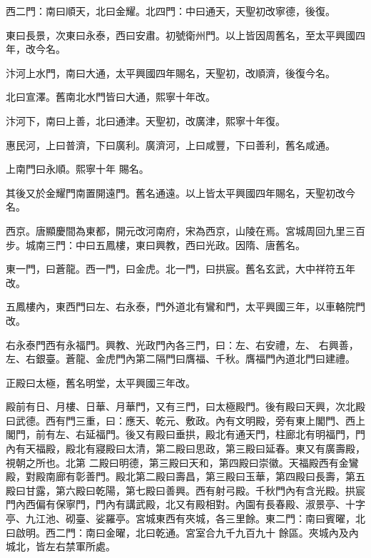 \begin{pinyinscope}
 西二門：南曰順天，北曰金耀。北四門：中曰通天，天聖初改寧德，後復。



 東曰長景，次東曰永泰，西曰安肅。初號衛州門。以上皆因周舊名，至太平興國四年，改今名。



 汴河上水門，南曰大通，太平興國四年賜名，天聖初，改順濟，後復今名。



 北曰宣澤。舊南北水門皆曰大通，熙寧十年改。



 汴河下，南曰上善，北曰通津。天聖初，改廣津，熙寧十年復。



 惠民河，上曰普濟，下曰廣利。廣濟河，上曰咸豐，下曰善利，舊名咸通。



 上南門曰永順。熙寧十年
 賜名。



 其後又於金耀門南置開遠門。舊名通遠。以上皆太平興國四年賜名，天聖初改今名。



 西京。唐顯慶間為東都，開元改河南府，宋為西京，山陵在焉。宮城周回九里三百步。城南三門：中曰五鳳樓，東曰興教，西曰光政。因隋、唐舊名。



 東一門，曰蒼龍。西一門，曰金虎。北一門，曰拱宸。舊名玄武，大中祥符五年改。



 五鳳樓內，東西門曰左、右永泰，門外道北有鸞和門，太平興國三年，以車輅院門改。



 右永泰門西有永福門。興教、光政門內各三門，曰：左、右安禮，左、
 右興善，左、右銀臺。蒼龍、金虎門內第二隔門曰膺福、千秋。膺福門內道北門曰建禮。



 正殿曰太極，舊名明堂，太平興國三年改。



 殿前有日、月樓、日華、月華門，又有三門，曰太極殿門。後有殿曰天興，次北殿曰武德。西有門三重，曰：應天、乾元、敷政。內有文明殿，旁有東上閣門、西上閣門，前有左、右延福門。後又有殿曰垂拱，殿北有通天門，柱廊北有明福門，門內有天福殿，殿北有寢殿曰太清，第二殿曰思政，第三殿曰延春。東又有廣壽殿，視朝之所也。北第
 二殿曰明德，第三殿曰天和，第四殿曰崇徽。天福殿西有金鸞殿，對殿南廊有彰善門。殿北第二殿曰壽昌，第三殿曰玉華，第四殿曰長壽，第五殿曰甘露，第六殿曰乾陽，第七殿曰善興。西有射弓殿。千秋門內有含光殿。拱宸門內西偏有保寧門，門內有講武殿，北又有殿相對。內園有長春殿、淑景亭、十字亭、九江池、砌臺、娑羅亭。宮城東西有夾城，各三里餘。東二門：南曰賓曜，北曰啟明。西二門：南曰金曜，北曰乾通。宮室合九千九百九十
 餘區。夾城內及內城北，皆左右禁軍所處。




\end{pinyinscope}
